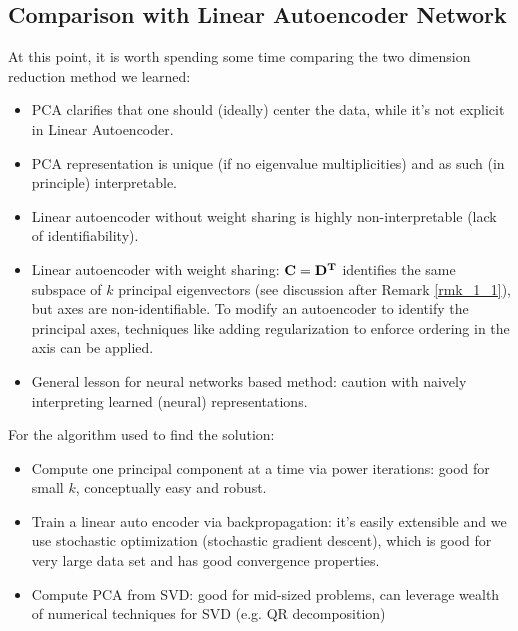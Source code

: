 \documentclass[../book-template.tex]{subfiles}
\begin{document}
\subsection{Comparison with Linear Autoencoder Network}
At this point, it is worth spending some time comparing the two dimension reduction method we learned:
\begin{itemize}
    \item PCA clarifies that one should (ideally) center the data, while it's not explicit in Linear Autoencoder.
    \item PCA representation is unique (if no eigenvalue multiplicities) and as such (in principle) interpretable.
    \item Linear autoencoder without weight sharing is highly non-interpretable (lack of identifiability).
    \item Linear autoencoder with weight sharing: ${\bf C=D^T}$ identifies the same subspace of $k$ principal eigenvectors (see discussion after Remark \ref{rmk_1_1}), but axes are non-identifiable. To modify an autoencoder to identify the principal axes, techniques like adding regularization to enforce ordering in the axis can be applied.
    \item General lesson for neural networks based method: caution with naively interpreting learned (neural) representations.
\end{itemize}
\par For the algorithm used to find the solution:
\begin{itemize}
    \item Compute one principal component at a time via power iterations: good for small $k$, conceptually easy and robust.
    \item Train a linear auto encoder via backpropagation: it's easily extensible and we use stochastic optimization (stochastic gradient descent), which is good for very large data set and has good convergence properties.
    \item Compute PCA from SVD: good for mid-sized problems, can leverage wealth of numerical techniques for SVD (e.g. QR decomposition)
\end{itemize}
\end{document}
